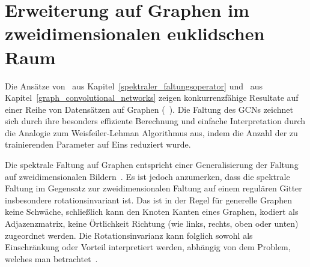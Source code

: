 \section{Erweiterung auf Graphen im zweidimensionalen euklidschen Raum}
\label{gcn_erweiterung}

Die Ansätze von~\citeauthor{Defferrard} aus Kapitel~\ref{spektraler_faltungsoperator} und~\citeauthor{gcn} aus Kapitel~\ref{graph_convolutional_networks} zeigen konkurrenzfähige Resultate auf einer Reihe von Datensätzen auf Graphen (\vgl{}~\cite{Defferrard, gcn}).
Die Faltung des \glspl{GCN} zeichnet sich durch ihre besonders effiziente Berechnung und einfache Interpretation durch die Analogie zum Weisfeiler-Lehman Algorithmus aus, indem die Anzahl der zu trainierenden Parameter auf Eins reduziert wurde.

Die spektrale Faltung auf Graphen entspricht einer Generalisierung der Faltung auf zweidimensionalen Bildern~\cite{gcn_review}.
Es ist jedoch anzumerken, dass die spektrale Faltung im Gegensatz zur zweidimensionalen Faltung auf einem regulären Gitter insbesondere rotationsinvariant ist.
Das ist in der Regel für generelle Graphen keine Schwäche, schließlich kann den Knoten \bzw{} Kanten eines Graphen, kodiert als Adjazenzmatrix, keine Örtlichkeit \bzw{} Richtung (wie links, rechts, oben oder unten) zugeordnet werden.
Die Rotationsinvarianz kann folglich sowohl als Einschränkung oder Vorteil interpretiert werden, abhängig von dem Problem, welches man betrachtet~\cite{Defferrard}.

